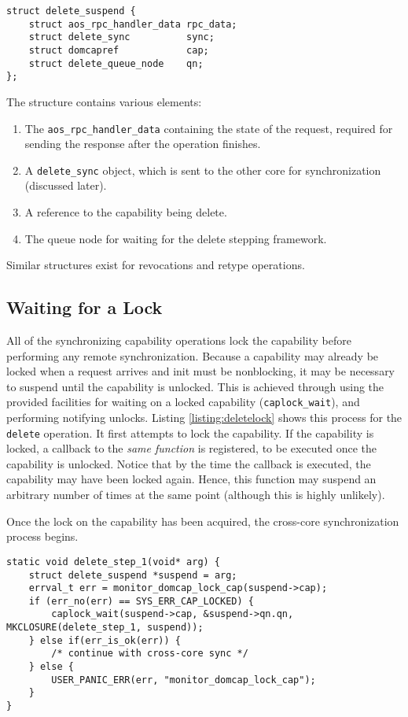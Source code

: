 \begin{lstlisting}[caption={State preserved across suspension points in the delete handler},label={listing:delsuspend}]
struct delete_suspend {
    struct aos_rpc_handler_data rpc_data;
    struct delete_sync          sync;
    struct domcapref            cap;
    struct delete_queue_node    qn;
};
\end{lstlisting}

The structure contains various elements:
\begin{enumerate}
    \item The \texttt{aos\_rpc\_handler\_data} containing the state of the request, required for sending the response after the operation finishes.
    \item A \texttt{delete\_sync} object, which is sent to the other core for synchronization (discussed later).
    \item A reference to the capability being delete.
    \item The queue node for waiting for the delete stepping framework.
\end{enumerate}
Similar structures exist for revocations and retype operations.

\subsection{Waiting for a Lock}
All of the synchronizing capability operations lock the capability before performing any remote synchronization. Because a capability may already be locked when a request arrives and init must be nonblocking, it may be necessary to suspend until the capability is unlocked. This is achieved through using the provided facilities for waiting on a locked capability (\texttt{caplock\_wait}), and performing notifying unlocks. Listing \ref{listing:deletelock} shows this process for the \texttt{delete} operation. It first attempts to lock the capability. If the capability is locked, a callback to the \textit{same function} is registered, to be executed once the capability is unlocked. Notice that by the time the callback is executed, the capability may have been locked again. Hence, this function may suspend an arbitrary number of times at the same point (although this is highly unlikely).

Once the lock on the capability has been acquired, the cross-core synchronization process begins.

\begin{lstlisting}[caption={Waiting for a lock before beginning the capability deletion process},label={listing:deletelock}]
static void delete_step_1(void* arg) {
    struct delete_suspend *suspend = arg;
    errval_t err = monitor_domcap_lock_cap(suspend->cap);
    if (err_no(err) == SYS_ERR_CAP_LOCKED) {
        caplock_wait(suspend->cap, &suspend->qn.qn, MKCLOSURE(delete_step_1, suspend));
    } else if(err_is_ok(err)) {
        /* continue with cross-core sync */
    } else {
        USER_PANIC_ERR(err, "monitor_domcap_lock_cap");
    }
}
\end{lstlisting}

